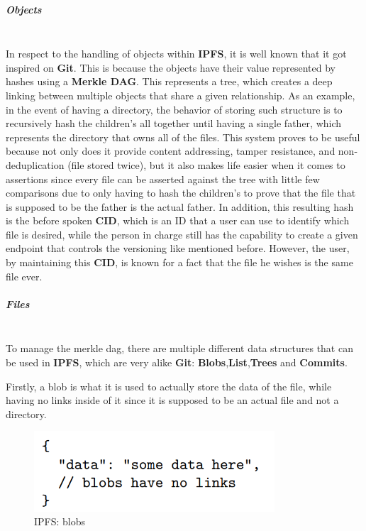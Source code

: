 \subparagraph{Objects}  \mbox{} \\
In respect to the handling of objects within \textbf{IPFS}, it is well known that it got inspired on \textbf{Git}. This is because the objects have their value represented by hashes using a \textbf{Merkle DAG}. This represents a tree, which creates a deep linking between multiple objects that share a given relationship. As an example, in the event of having a directory, the behavior of storing such structure is to recursively hash the children's all together until having a single father, which represents the directory that owns all of the files. This system proves to be useful because not only does it provide content addressing, tamper resistance, and non-deduplication (file stored twice), but it also makes life easier when it comes to assertions since every file can be asserted against the tree with little few comparisons due to only having to hash the children's to prove that the file that is supposed to be the father is the actual father. In addition, this resulting hash is the before spoken \textbf{CID}, which is an ID that a user can use to identify which file is desired, while the person in charge still has the capability to create a given endpoint that controls the versioning like mentioned before. However, the user, by maintaining this \textbf{CID}, is known for a fact that the file he wishes is the same file ever.

\subparagraph{Files}  \mbox{} \\
To manage the merkle dag, there are multiple different data structures that can be used in \textbf{IPFS}, which are very alike \textbf{Git}: \textbf{Blobs},\textbf{List},\textbf{Trees} and \textbf{Commits}. 

Firstly, a blob is what it is used to actually store the data of the file, while having no links inside of it since it is supposed to be an actual file and not a directory.

\begin{figure}[H]
    \centering
    \includegraphics[width=0.8\textwidth]{assets/use-case-1/blobs.png} %
    \caption{IPFS: blobs}
    \label{fig:sample-image} 
\end{figure}

